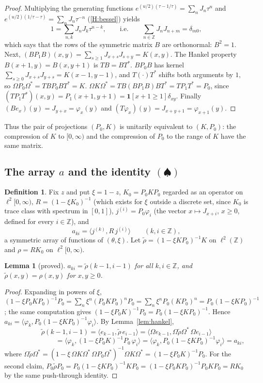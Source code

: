 \documentclass[11pt]{article}
\newtheorem{lemma}[theorem]{Lemma}
\theoremstyle{definition}
\newtheorem{definition}[theorem]{Definition}
\theoremstyle{remark}
\newcommand{\Z}{\mathbb{Z}}
\begin{document}
\begin{proof}
Multiplying the generating functions $e^{(u/2)(\tau-1/\tau)}=\sum_nJ_n\tau^n$ and $e^{(u/2)(1/\tau-\tau)}=\sum_nJ_n\tau^{-n}$ (\ref{H:bessel}) yields
\[
1=\sum_{n,k}J_nJ_k\tau^{n-k},\qquad\text{i.e.}\qquad\sum_{n\in\Z}J_nJ_{n+m}=\delta_{m0},
\]
which says that the rows of the symmetric matrix $B$ are orthonormal: $B^2=1$. Next, $(BP_1B)(x,y)=\sum_{s\ge1}J_{x+s}J_{s+y}=K(x,y)$. The Hankel property $B(x+1,y)=B(x,y+1)$ is $TB=BT^*$. $BP_0B$ has kernel $\sum_{s\ge0}J_{x+s}J_{y+s}=K(x-1,y-1)$, and $T(\cdot)T^*$ shifts both arguments by $1$, so $\Omega P_0\Omega^*=TBP_0BT^*=K$. $\Omega K\Omega^*=TB(BP_1B)BT^*=TP_1T^*=P_0$, since $(TP_1T^*)(x,y)=P_1(x+1,y+1)=\mathbf 1[x+1\ge1]\delta_{xy}$. Finally $(Be_x)(y)=J_{y+x}=\varphi_x(y)$ and $(T\varphi_x)(y)=J_{x+y+1}=\varphi_{x+1}(y)$.
\end{proof}

Thus the pair of projections $(P_0,K)$ is unitarily equivalent to $(K,P_0)$: the compression of $K$ to $[0,\infty)$ and the compression of $P_0$ to the range of $K$ have the same matrix.

\subsection{The array $a$ and the identity $(\spadesuit)$}

\begin{definition}
Fix $z$ and put $\xi=1-z$, $K_0=P_0KP_0$ regarded as an operator on $\ell^2[0,\infty)$, $R=(1-\xi K_0)^{-1}$ (which exists for $\xi$ outside a discrete set, since $K_0$ is trace class with spectrum in $[0,1]$), $j^{(i)}=P_0\varphi_i$ (the vector $x\mapsto J_{x+i}$, $x\ge0$, defined for every $i\in\Z$), and
\[
a_{ki}=\langle j^{(k)},R\,j^{(i)}\rangle\qquad(k,i\in\Z),
\]
a symmetric array of functions of $(\theta,\xi)$. Let $\tilde\rho=(1-\xi KP_0)^{-1}K$ on $\ell^2(\Z)$ and $\rho=RK_0$ on $\ell^2[0,\infty)$.
\end{definition}

\begin{lemma}[proved]\label{lem:selfdual}
$a_{ki}=\tilde\rho(k-1,i-1)$ for all $k,i\in\Z$, and $\tilde\rho(x,y)=\rho(x,y)$ for $x,y\ge0$.
\end{lemma}

\begin{proof}
Expanding in powers of $\xi$, $(1-\xi P_0KP_0)^{-1}P_0=\sum_n\xi^n(P_0KP_0)^nP_0=\sum_n\xi^nP_0(KP_0)^n=P_0(1-\xi KP_0)^{-1}$; the same computation gives $(1-\xi P_0K)^{-1}P_0=P_0(1-\xi KP_0)^{-1}$. Hence $a_{ki}=\langle\varphi_k,P_0(1-\xi KP_0)^{-1}\varphi_i\rangle$. By Lemma~\ref{lem:hankel},
\[
\tilde\rho(k-1,i-1)=\langle e_{k-1},\tilde\rho\,e_{i-1}\rangle=\langle\Omega e_{k-1},\Omega\tilde\rho\Omega^*\,\Omega e_{i-1}\rangle
\]
\[
\phantom{\tilde\rho(k-1,i-1)}=\bigl\langle\varphi_k,(1-\xi P_0K)^{-1}P_0\,\varphi_i\bigr\rangle=\bigl\langle\varphi_k,P_0(1-\xi KP_0)^{-1}\varphi_i\bigr\rangle=a_{ki},
\]
where $\Omega\tilde\rho\Omega^*=(1-\xi\,\Omega K\Omega^*\,\Omega P_0\Omega^*)^{-1}\Omega K\Omega^*=(1-\xi P_0K)^{-1}P_0$. For the second claim, $P_0\tilde\rho P_0=P_0(1-\xi KP_0)^{-1}KP_0=(1-\xi P_0KP_0)^{-1}P_0KP_0=RK_0$ by the same push-through identity.
\end{proof}
\end{document}

